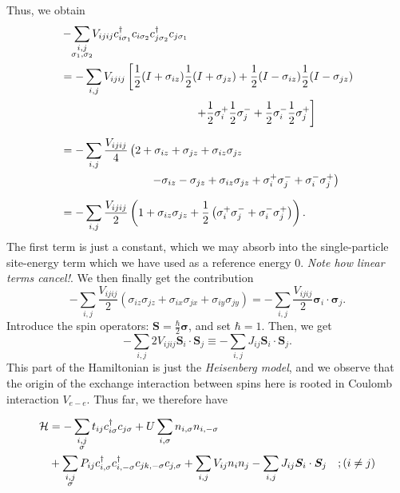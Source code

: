 Thus, we obtain
\begin{align*}
		&-\sum_{\mathclap{\substack{i,j \\ \sigma_1, \sigma_2}}}V_{ijij}\cd_{i\sigma_1}c_{i\sigma_2}\cd_{j\sigma_2}c_{j\sigma_1} \\
		&=-\sum_{i,j}V_{ijij}\left [ \frac{1}{2}(I +\sigma_{iz}) \frac{1}{2}(I +\sigma_{jz}) + \frac{1}{2}(I -\sigma_{iz}) \frac{1}{2}(I -\sigma_{jz})\right .\\
		&\qquad\qquad\qquad\qquad\qquad\qquad  \left. + \frac{1}{2}\sigma_{i}^{+}\frac{1}{2}\sigma_{j}^{-} + \frac{1}{2}\sigma_{i}^{-}\frac{1}{2}\sigma_{j}^{+}\right ] \\[1.5ex]
		&= -\sum_{i,j}\frac{V_{ijij}}{4}\left (\vphantom{\sigma_{j}^{+}}2 + \sigma_{iz} + \sigma_{jz} + \sigma_{iz}\sigma_{jz} \right .\\
		&\qquad\qquad\qquad\qquad \left. - \sigma_{iz} - \sigma_{jz} + \sigma_{iz}\sigma_{jz} 
	+\sigma_{i}^{+}\sigma_{j}^{-} + \sigma_{i}^{-}\sigma_{j}^{+}\right ) \\[1.5ex]
	&=-\sum_{i,j}\frac{V_{ijij}}{2}\left (1 + \sigma_{iz}\sigma_{jz} + \frac{1}{2}\left (\sigma_{i}^{+}\sigma_{j}^{-} + \sigma_{i}^{-}\sigma_{j}^{+}\right )\right ).
\end{align*}
The first term is just a constant, which we may absorb into the single-particle site-energy term which we have used as a reference energy $0$. \emph{Note how linear terms cancel!}.
We then finally get the contribution 
\begin{equation}
	-\sum_{i,j}\frac{V_{ijij}}{2}\left (\sigma_{iz}\sigma_{jz} +\sigma_{ix}\sigma_{jx}+\sigma_{iy}\sigma_{jy} \right ) = -\sum_{i,j}\frac{V_{ijij}}{2}\bm{\sigma}_{i}\cdot \bm{\sigma}_{j}.
\end{equation}
Introduce the spin operators: $\bm{S} = \frac{\hbar}{2}\bm{\sigma}$, and set $\hbar= 1$. 
Then, we get
\begin{equation}
	-\sum_{i,j}2V_{ijij}\bm{S}_{i}\cdot\bm{S}_{j} \equiv -\sum_{i,j} J_{ij}\bm{S}_{i}\cdot\bm{S}_{j}.
\end{equation}
This part of the Hamiltonian is just the \emph{Heisenberg model}, and we observe that the origin of the exchange interaction between spins here is rooted in Coulomb interaction $V_{e-e}$.
Thus far, we therefore have
\begin{tcolorbox}
	\begin{align*}
		\Ha &= -\sum_{\mathclap{\substack{i,j\\ \sigma}}}t_{ij}\cd_{i\sigma}c_{j\sigma} + U\sum_{i,\sigma}n_{i,\sigma}n_{i,-\sigma} \\
		& + \sum_{\mathclap{\substack{i,j\\ \sigma}}} P_{ij}\cd_{i,\sigma}\cd_{i,-\sigma}c_{jk,-\sigma}c_{j,\sigma} + \sum_{i,j}V_{ij}n_{i}n_{j}  - \sum_{i,j}J_{ij}\bm{S}_{i}\cdot\bm{S}_{j} \quad ; (i\ne j)
	\end{align*}
\end{tcolorbox}
